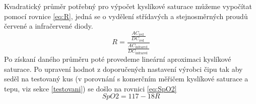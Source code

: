 Kvadratický průměr potřebný pro výpočet kyslíkové saturace můžeme vypočítat pomocí rovnice \eqref{eq:R}, jedná se o vydělení střídavých a stejnosměrných proudů červené a infračervené diody. 
\begin{equation}\label{eq:R}
    R=\frac{\frac{A C_{\text {red }}}{D C_{\text {red }}}}{\frac{A C_{\text {infrared }}}{D C_{\text {infrared }}}}
\end{equation}
Po získaní daného průměru poté provedeme lineární aproximaci kyslíkové saturace. Po upravení hodnot z doporučených nastavení \cite{max30102-application-node} výrobci čipu tak aby seděl na testovaný kus (v porovnání s komerčním měřičem kyslíkové saturace a tepu, viz sekce \ref{testovani}) se došlo na rovnici \eqref{eq:SpO2}
\begin{equation}\label{eq:SpO2}
    SpO2 = 117 - 18R
\end{equation}

\newpage
